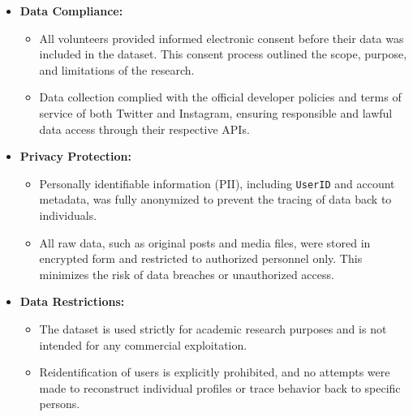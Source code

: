 \begin{itemize}
	\item \textbf{Data Compliance:}
	\begin{itemize}
		\item All volunteers provided informed electronic consent before their data was included in the dataset. This consent process outlined the scope, purpose, and limitations of the research.
		\item Data collection complied with the official developer policies and terms of service of both Twitter and Instagram, ensuring responsible and lawful data access through their respective APIs.
	\end{itemize}
	
	\item \textbf{Privacy Protection:}
	\begin{itemize}
		\item Personally identifiable information (PII), including \texttt{UserID} and account metadata, was fully anonymized to prevent the tracing of data back to individuals.
		\item All raw data, such as original posts and media files, were stored in encrypted form and restricted to authorized personnel only. This minimizes the risk of data breaches or unauthorized access.
	\end{itemize}
	
	\item \textbf{Data Restrictions:}
	\begin{itemize}
		\item The dataset is used strictly for academic research purposes and is not intended for any commercial exploitation.
		\item Reidentification of users is explicitly prohibited, and no attempts were made to reconstruct individual profiles or trace behavior back to specific persons.
	\end{itemize}
\end{itemize}



\begin{comment}
If applicable, describe possible commercialization and/or innovation in your research.
\end{comment}

